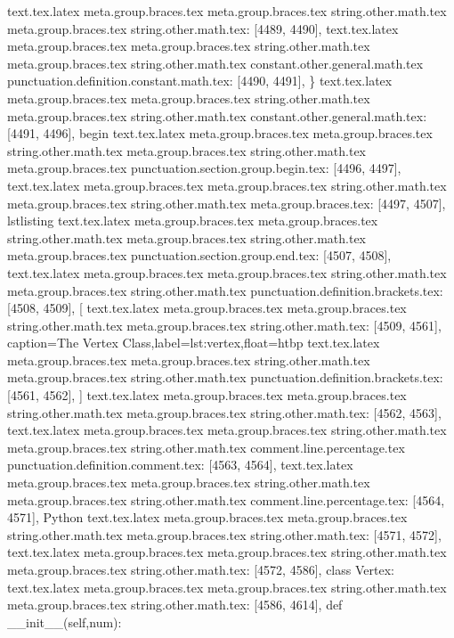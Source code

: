 {{{{{{{{{{{{{{{{{{{{{{{{{{{{{{{{{{{{{{{{{{{{{{{{{{{{{{{{{{{{{{{{{{{{{{{{{{{{{{{{{{{{{{{{{{{{{{{{{{{{{{{{{{{{{{{{{{{{{{{{{{{{{{{{{{{{{{{{{{{{{{text.tex.latex meta.group.braces.tex meta.group.braces.tex string.other.math.tex meta.group.braces.tex string.other.math.tex: [4489, 4490], {
}
text.tex.latex meta.group.braces.tex meta.group.braces.tex string.other.math.tex meta.group.braces.tex string.other.math.tex constant.other.general.math.tex punctuation.definition.constant.math.tex: [4490, 4491], {\}
text.tex.latex meta.group.braces.tex meta.group.braces.tex string.other.math.tex meta.group.braces.tex string.other.math.tex constant.other.general.math.tex: [4491, 4496], {begin}
text.tex.latex meta.group.braces.tex meta.group.braces.tex string.other.math.tex meta.group.braces.tex string.other.math.tex meta.group.braces.tex punctuation.section.group.begin.tex: [4496, 4497], {{}
text.tex.latex meta.group.braces.tex meta.group.braces.tex string.other.math.tex meta.group.braces.tex string.other.math.tex meta.group.braces.tex: [4497, 4507], {lstlisting}
text.tex.latex meta.group.braces.tex meta.group.braces.tex string.other.math.tex meta.group.braces.tex string.other.math.tex meta.group.braces.tex punctuation.section.group.end.tex: [4507, 4508], {}}
text.tex.latex meta.group.braces.tex meta.group.braces.tex string.other.math.tex meta.group.braces.tex string.other.math.tex punctuation.definition.brackets.tex: [4508, 4509], {[}
text.tex.latex meta.group.braces.tex meta.group.braces.tex string.other.math.tex meta.group.braces.tex string.other.math.tex: [4509, 4561], {caption=The Vertex Class,label=lst:vertex,float=htbp}
text.tex.latex meta.group.braces.tex meta.group.braces.tex string.other.math.tex meta.group.braces.tex string.other.math.tex punctuation.definition.brackets.tex: [4561, 4562], {]}
text.tex.latex meta.group.braces.tex meta.group.braces.tex string.other.math.tex meta.group.braces.tex string.other.math.tex: [4562, 4563], { }
text.tex.latex meta.group.braces.tex meta.group.braces.tex string.other.math.tex meta.group.braces.tex string.other.math.tex comment.line.percentage.tex punctuation.definition.comment.tex: [4563, 4564], {%
text.tex.latex meta.group.braces.tex meta.group.braces.tex string.other.math.tex meta.group.braces.tex string.other.math.tex comment.line.percentage.tex: [4564, 4571], { Python}
text.tex.latex meta.group.braces.tex meta.group.braces.tex string.other.math.tex meta.group.braces.tex string.other.math.tex: [4571, 4572], {
}
text.tex.latex meta.group.braces.tex meta.group.braces.tex string.other.math.tex meta.group.braces.tex string.other.math.tex: [4572, 4586], {class Vertex:
}
text.tex.latex meta.group.braces.tex meta.group.braces.tex string.other.math.tex meta.group.braces.tex string.other.math.tex: [4586, 4614], {    def __init__(self,num):
}}}}}}}}}}}}}}}}}}}}}}}}}}}}}}}}}}}}}}}}}}}}}}}}}}}}}}}}}}}}}}}}}}}}}}}}}}}}}}}}}}}}}}}}}}}}}}}}}}}}}}}}}}}}}}}}}}}}}}}}}}}}}}}}}}}}}}}}}}}}}}}}}
